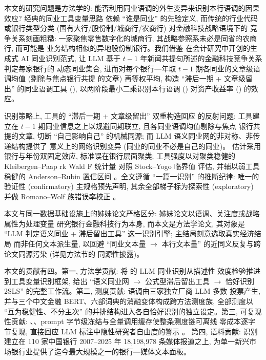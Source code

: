 本文的研究问题是方法学的: 能否利用同业语调的外生变异来识别本行语调的因果效应?
经典的同业工具变量思路 \parencite{leary2014peerfirms} 依赖 ``谁是同业'' 的先验定义,
而传统的行业代码或银行类型分类 (国有大行/股份制/城商行/农商行) 对金融科技战略语境下的
竞争关系刻画粗糙: 一家聚焦零售数字化的城商行, 其战略参照系未必是同省的农商行, 而可能是
业务结构相似的异地股份制银行。我们借鉴 \textcite{cao2025genai} 在会计研究中开创的生成式
AI 同业识别范式, 让 LLM 基于 $t-1$ 年新闻共提句所述的金融科技竞争关系判定每家银行的
动态同业集合, 进而对每个银行—年取 $t-1$ 期各同业的文章级语调均值 (剔除与焦点银行共提
的文章) 再等权平均, 构造 ``滞后一期 + 文章级留出'' 的同业语调工具
(), 以两阶段最小二乘识别本行语调
() 对资产收益率 () 的效应。

识别策略上, 工具的 ``滞后一期 + 文章级留出'' 双重构造回应 \textcite{manski1993reflection}
的反射问题: 工具建立在 $t-1$ 期同业信息之上以规避同期联立, 且各同业语调均值剔除与焦点
银行共提的文章, 切断 ``自己影响自己'' 的机械同源; 而 LLM 语义同业网的非对称、非传递结构提供了
\textcite{bramoulle2009networks} 意义上的网络识别变异 (同业的同业不必是自己的同业)。
估计采用银行与年份双固定效应, 标准误在银行层面聚类; 工具强度以对聚类稳健的
Kleibergen--Paap rk Wald F 统计量 \parencite{kleibergen2006rank} 对照 Stock--Yogo 临界值
\parencite{stock2005weak} 评估, 并辅以弱工具稳健的 Anderson--Rubin 置信区间
\parencite{andrews2019weakiv}。全文遵循 ``一篇一识别'' 的推断纪律: 唯一的验证性
(confirmatory) 主规格预先声明, 其余全部梯子标为探索性 (exploratory) 并做
Romano--Wolf 族错误率校正 \parencite{romano2005stepdown}。

本文与同一数据基础设施上的姊妹论文严格区分: 姊妹论文以语调、关注度或战略属性为处理变量
研究银行金融科技行为本身, 而本文是方法学论文, 其对象是 ``LLM 判定语义同业 + 滞后留出工具''
这一识别引擎; 主结局刻意选取真实经济结局  而非任何文本派生量, 以回避
``同业文本量 $\rightarrow$ 本行文本量'' 的近同义反复与跨论文同源污染 (详见方法节的
同源性披露)。

本文的贡献有四。第一, 方法学贡献: 将 \textcite{cao2025genai} 的 LLM 同业识别从描述性
效度检验推进到工具变量识别框架, 给出 ``语义同业网 $\rightarrow$ 公式型滞后留出工具
$\rightarrow$ 恰好识别 2SLS'' 的完整工作流。第二, 测度贡献: 语调由三家独立厂商 LLM 多数
投票产生, 并与三个中文金融 BERT、六部词典的消融变体构成跨方法测度族, 全部测度以
``互为稳健性、不分主次'' 的并排结构进入各自恰好识别的独立设定。第三, 可复现性贡献:
、、prompt 字节级冻结与全量调用缓存使整条测度链可离线
零成本逐字节复现, 直接回应 LLM 标注中隐性研究者自由度的警示 \parencite{baumann2025llmhacking}。
第四, 语料贡献: 识别建立在 110 家中国银行 2007--2025 年 18{,}198{,}978 条媒体报道之上,
为单一新兴市场银行业提供了迄今最大规模之一的银行—媒体文本面板。

